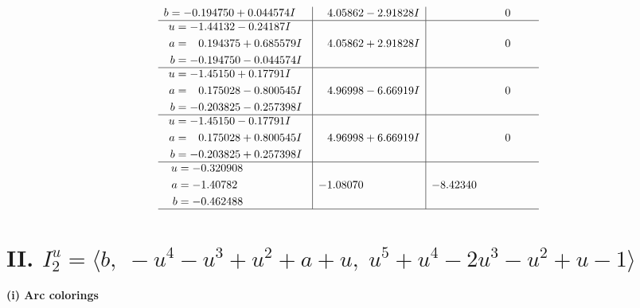 \documentclass[1p]{elsarticle_modified}
\theoremstyle{definition}
\begin{document}
$$\begin{array}{c|c|c}
\begin{aligned}
b &= -0.194750 + 0.044574 I\end{aligned}
 & \phantom{-}4.05862 - 2.91828 I & \phantom{-0.000000 } 0 \\ \hline\begin{aligned}
u &= -1.44132 - 0.24187 I \\
a &= \phantom{-}0.194375 + 0.685579 I \\
b &= -0.194750 - 0.044574 I\end{aligned}
 & \phantom{-}4.05862 + 2.91828 I & \phantom{-0.000000 } 0 \\ \hline\begin{aligned}
u &= -1.45150 + 0.17791 I \\
a &= \phantom{-}0.175028 - 0.800545 I \\
b &= -0.203825 - 0.257398 I\end{aligned}
 & \phantom{-}4.96998 - 6.66919 I & \phantom{-0.000000 } 0 \\ \hline\begin{aligned}
u &= -1.45150 - 0.17791 I \\
a &= \phantom{-}0.175028 + 0.800545 I \\
b &= -0.203825 + 0.257398 I\end{aligned}
 & \phantom{-}4.96998 + 6.66919 I & \phantom{-0.000000 } 0 \\ \hline\begin{aligned}
u &= -0.320908\phantom{ +0.000000I} \\
a &= -1.40782\phantom{ +0.000000I} \\
b &= -0.462488\phantom{ +0.000000I}\end{aligned}
 & -1.08070\phantom{ +0.000000I} & -8.42340\phantom{ +0.000000I}\\
 \hline 
 \end{array}$$\newpage\newpage\renewcommand{\arraystretch}{1}
\centering \section*{II. $I^u_{2}= \langle b,\;- u^4- u^3+u^2+a+u,\;u^5+u^4-2 u^3- u^2+u-1 \rangle$}
\flushleft \textbf{(i) Arc colorings}\\
\end{document}
